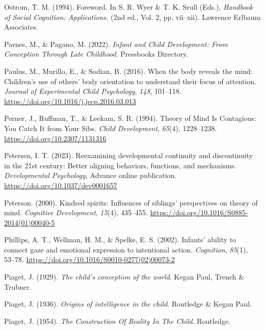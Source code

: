 \documentclass[
]{scrbook}
\newlength{\cslhangindent}
\newenvironment{CSLReferences}[2] %
 {\begin{list}{}{%
  \setlength{\itemindent}{0pt}
  \setlength{\leftmargin}{0pt}
  \setlength{\parsep}{0pt}
  \ifodd #1
   \setlength{\leftmargin}{\cslhangindent}
   \setlength{\itemindent}{-1\cslhangindent}
  \fi
  \setlength{\itemsep}{#2\baselineskip}}}
 {\end{list}}
\begin{document}
\begin{CSLReferences}{1}{0}
Ostrom, T. M. (1994). Foreword. In S. R. Wyer \& T. K. Srull (Eds.), \emph{Handbook of {Social Cognition}: {Applications}.} (2nd ed., Vol. 2, pp. vii--xii). Lawrence Erlbaum Associates.

Parnes, M., \& Pagano, M. (2022). \emph{Infant and {Child Development}: {From Conception Through Late Childhood}}. Pressbooks Directory.

Paulus, M., Murillo, E., \& Sodian, B. (2016). When the body reveals the mind: {Children}'s use of others' body orientation to understand their focus of attention. \emph{Journal of Experimental Child Psychology}, \emph{148}, 101--118. \url{https://doi.org/10.1016/j.jecp.2016.03.013}

Perner, J., Ruffman, T., \& Leekam, S. R. (1994). Theory of {Mind Is Contagious}: {You Catch It} from {Your Sibs}. \emph{Child Development}, \emph{65}(4), 1228--1238. \url{https://doi.org/10.2307/1131316}

Petersen, I. T. (2023). Reexamining developmental continuity and discontinuity in the 21st century: {Better} aligning behaviors, functions, and mechanisms. \emph{Developmental Psychology}, Advance online publication. \url{https://doi.org/10.1037/dev0001657}

Peterson. (2000). Kindred spirits: {Influences} of siblings' perspectives on theory of mind. \emph{Cognitive Development}, \emph{15}(4), 435--455. \url{https://doi.org/10.1016/S0885-2014(01)00040-5}

Phillips, A. T., Wellman, H. M., \& Spelke, E. S. (2002). Infants' ability to connect gaze and emotional expression to intentional action. \emph{Cognition}, \emph{85}(1), 53--78. \url{https://doi.org/10.1016/S0010-0277(02)00073-2}

Piaget, J. (1929). \emph{The child's conception of the world}. Kegan Paul, Trench \& Trubner.

Piaget, J. (1936). \emph{Origins of intelligence in the child}. Routledge \& Kegan Paul.

Piaget, J. (1954). \emph{The {Construction Of Reality In The Child}}. Routledge.


\end{CSLReferences}
\end{document}
